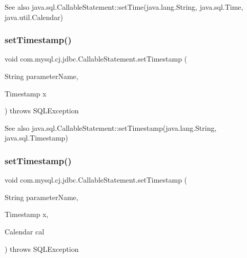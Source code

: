 \begin{DoxySeeAlso}{See also}
java.\+sql.\+Callable\+Statement\+::set\+Time(java.\+lang.\+String, java.\+sql.\+Time, java.\+util.\+Calendar) 
\end{DoxySeeAlso}
\mbox{\label{classcom_1_1mysql_1_1cj_1_1jdbc_1_1_callable_statement_a5032ac718b4fbbb1cfd23077cc37ec20}} 
\subsubsection{\texorpdfstring{set\+Timestamp()}{setTimestamp()}\hspace{0.1cm}{\footnotesize\ttfamily [1/2]}}
{\footnotesize\ttfamily void com.\+mysql.\+cj.\+jdbc.\+Callable\+Statement.\+set\+Timestamp (\begin{DoxyParamCaption}\item[{String}]{parameter\+Name,  }\item[{Timestamp}]{x }\end{DoxyParamCaption}) throws S\+Q\+L\+Exception}

\begin{DoxySeeAlso}{See also}
java.\+sql.\+Callable\+Statement\+::set\+Timestamp(java.\+lang.\+String, java.\+sql.\+Timestamp) 
\end{DoxySeeAlso}
\mbox{\label{classcom_1_1mysql_1_1cj_1_1jdbc_1_1_callable_statement_adeaf8f538114ab776d3f9063134709a7}} 
\subsubsection{\texorpdfstring{set\+Timestamp()}{setTimestamp()}\hspace{0.1cm}{\footnotesize\ttfamily [2/2]}}
{\footnotesize\ttfamily void com.\+mysql.\+cj.\+jdbc.\+Callable\+Statement.\+set\+Timestamp (\begin{DoxyParamCaption}\item[{String}]{parameter\+Name,  }\item[{Timestamp}]{x,  }\item[{Calendar}]{cal }\end{DoxyParamCaption}) throws S\+Q\+L\+Exception}

